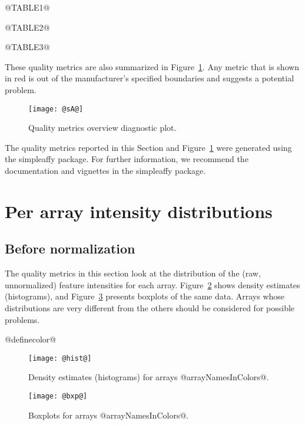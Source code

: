 \documentclass[11pt]{article}
\newcommand{\Rpackage}[1]{{\textsf{#1}}}
\begin{document}
@TABLE1@

@TABLE2@

@TABLE3@

These quality metrics are also summarized in 
Figure~\ref{fig:sA}. Any metric
that is shown in red is out of the manufacturer's specified boundaries
and suggests a potential problem.


\begin{figure}[tp]
\begin{center}
\texttt{[image: @sA@]}
\caption{\label{fig:sA}%
Quality metrics overview diagnostic plot.}
\end{center}
\end{figure}

The quality metrics reported in this Section and Figure~\ref{fig:sA}
were generated using the \Rpackage{simpleaffy} package. For further
information, we recommend the documentation and vignettes
in the \Rpackage{simpleaffy} package.


\section{Per array intensity distributions}
\subsection{Before normalization}
The quality metrics in this section look at the distribution of the
(raw, unnormalized) feature intensities for each array.
Figure~\ref{fig:hist} shows density estimates (histograms),
and Figure~\ref{fig:bxp} presents boxplots of the same data.  
Arrays whose distributions are very different from the others should be 
considered for possible problems.

@definecolor@

\begin{figure}[tp]
\begin{center}
\texttt{[image: @hist@]}
\caption{\label{fig:hist}%
Density estimates (histograms) for arrays @arrayNamesInColors@.}
\end{center}
\end{figure}

\begin{figure}[tp]
\begin{center}
\texttt{[image: @bxp@]}
\caption{\label{fig:bxp}%
Boxplots for arrays @arrayNamesInColors@.}
\end{center}
\end{figure}
\end{document}
